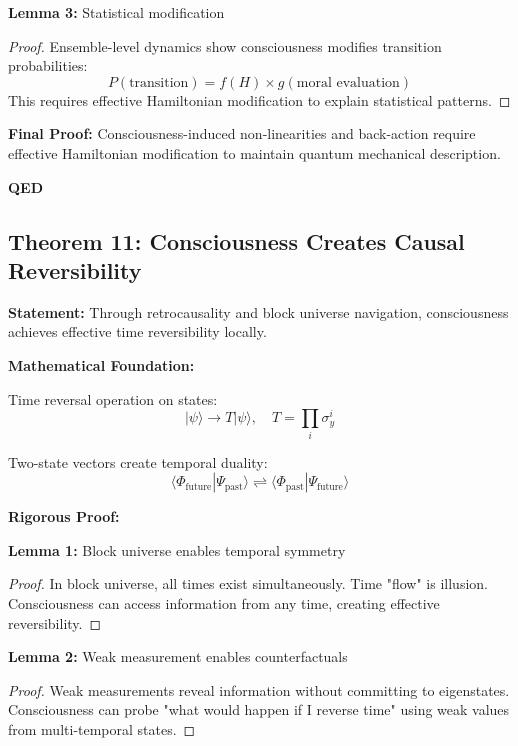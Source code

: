 \documentclass[12pt,a4paper]{article}
\theoremstyle{definition}
\begin{document}
\textbf{Lemma 3:} Statistical modification
\begin{proof}
Ensemble-level dynamics show consciousness modifies transition probabilities:
\begin{equation}
P(\text{transition}) = f(H) \times g(\text{moral evaluation})
\end{equation}
This requires effective Hamiltonian modification to explain statistical patterns.
\end{proof}

{\bf Final Proof:} Consciousness-induced non-linearities and back-action require effective Hamiltonian modification to maintain quantum mechanical description.

{\bf QED}

\subsection{Theorem 11: Consciousness Creates Causal Reversibility}

{\bf Statement:} Through retrocausality and block universe navigation, consciousness achieves effective time reversibility locally.

{\bf Mathematical Foundation:}

Time reversal operation on states:
\begin{equation}
|\psi\rangle \rightarrow T|\psi\rangle, \quad T = \prod_i \sigma_y^i
\end{equation}

Two-state vectors create temporal duality:
\begin{equation}
\langle\Phi_{\text{future}}|\Psi_{\text{past}}\rangle \rightleftharpoons \langle\Phi_{\text{past}}|\Psi_{\text{future}}\rangle
\end{equation}

{\bf Rigorous Proof:}

\textbf{Lemma 1:} Block universe enables temporal symmetry
\begin{proof}
In block universe, all times exist simultaneously. Time "flow" is illusion. Consciousness can access information from any time, creating effective reversibility.
\end{proof}

\textbf{Lemma 2:} Weak measurement enables counterfactuals
\begin{proof}
Weak measurements reveal information without committing to eigenstates. Consciousness can probe "what would happen if I reverse time" using weak values from multi-temporal states.
\end{proof}
\end{document}
